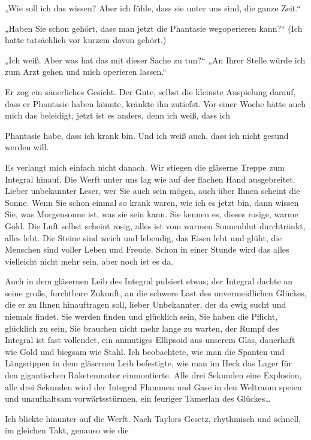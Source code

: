 „Wie soll ich das wissen? Aber ich fühle, dass sie unter uns sind,
die ganze Zeit.“

„Haben Sie schon gehört, dass man jetzt die Phantasie wegoperieren
kann?“ (Ich hatte tatsächlich vor kurzem davon gehört.)

„Ich weiß. Aber was hat das mit dieser Sache zu tun?“ „An Ihrer
Stelle würde ich zum Arzt gehen und mich operieren lassen.“

Er zog ein säuerliches Gesicht. Der Gute, selbst die kleinste
Anspielung darauf, dass er Phantasie haben könnte, kränkte ihn
zutiefst. Vor einer Woche hätte auch mich das beleidigt, jetzt ist
es anders, denn ich weiß, dass ich

Phantasie habe, dass ich krank bin. Und ich weiß auch, dass ich
nicht gesund werden will.

Es verlangt mich einfach nicht danach. Wir stiegen die gläserne
Treppe zum Integral hinauf. Die Werft unter uns lag wie auf der
flachen Hand ausgebreitet. Lieber unbekannter Leser, wer Sie auch
sein mögen, auch über Ihnen scheint die Sonne. Wenn Sie schon
einmal so krank waren, wie ich es jetzt bin, dann wissen Sie, was
Morgensonne ist, was sie sein kann. Sie kennen es, dieses rosige,
warme Gold. Die Luft selbst scheint rosig, alles ist vom warmen
Sonnenblut durchtränkt, alles lebt. Die Steine sind weich und
lebendig, das Eisen lebt und glüht, die Menschen sind voller Leben
und Freude. Schon in einer Stunde wird das alles vielleicht nicht
mehr sein, aber noch ist es da.

Auch in dem gläsernen Leib des Integral pulsiert etwas; der
Integral dachte an seine große, furchtbare Zukunft, an die schwere
Last des unvermeidlichen Glückes, die er zu Ihnen hinauftragen
soll, lieber Unbekannter, der da ewig sucht und niemals findet. Sie
werden finden und glücklich sein, Sie haben die Pflicht, glücklich
zu sein, Sie brauchen nicht mehr lange zu warten, der Rumpf des
Integral ist fast vollendet, ein anmutiges Ellipsoid aus unserem
Glas, dauerhaft wie Gold und biegsam wie Stahl. Ich beobachtete,
wie man die Spanten und Längsrippen in dem gläsernen Leib
befestigte, wie man im Heck das Lager für den gigantischen
Raketenmotor einmontierte. Alle drei Sekunden eine Explosion, alle
drei Sekunden wird der Integral Flammen und Gase in den Weltraum
speien und unaufhaltsam vorwärtsstürmen, ein feuriger Tamerlan des
Glückes\ldots{}

Ich blickte hinunter auf die Werft. Nach Taylors Gesetz, rhythmisch
und schnell, im gleichen Takt, genauso wie die

